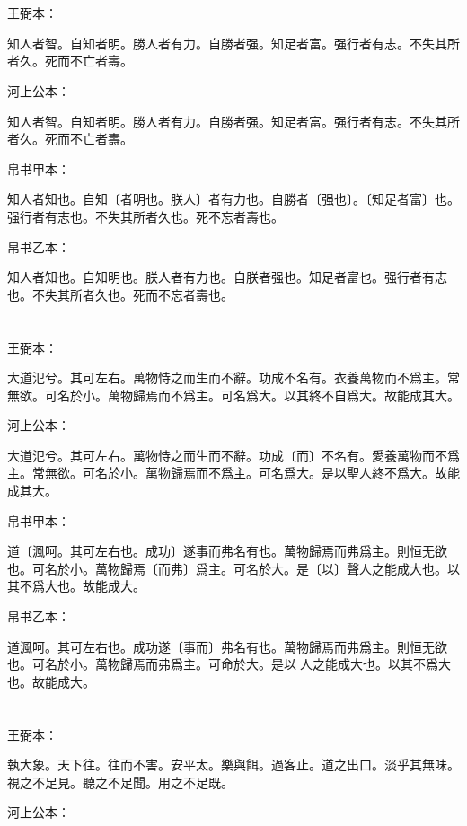 \documentclass[a5paper]{ctexbook}
\begin{document}
    \chapter{}
    王弼本：

    知人者智。自知者明。勝人者有力。自勝者强。知足者富。强行者有志。不失其所者久。死而不亡者壽。

    河上公本：

    知人者智。自知者明。勝人者有力。自勝者强。知足者富。强行者有志。不失其所者久。死而不亡者壽。

    帛书甲本：

    知人者知也。自知〔者明也。朕人〕者有力也。自勝者〔强也〕。〔知足者富〕也。强行者有志也。不失其所者久也。死不忘者壽也。

    帛书乙本：

    知人者知也。自知明也。朕人者有力也。自朕者强也。知足者富也。强行者有志也。不失其所者久也。死而不忘者壽也。

    \chapter{}
    王弼本：

    大道氾兮。其可左右。萬物恃之而生而不辭。功成不名有。衣養萬物而不爲主。常無欲。可名於小。萬物歸焉而不爲主。可名爲大。以其終不自爲大。故能成其大。

    河上公本：

    大道氾兮。其可左右。萬物恃之而生而不辭。功成〔而〕不名有。愛養萬物而不爲主。常無欲。可名於小。萬物歸焉而不爲主。可名爲大。是以聖人終不爲大。故能成其大。

    帛书甲本：

    道〔渢呵。其可左右也。成功〕遂事而弗名有也。萬物歸焉而弗爲主。則恒无欲也。可名於小。萬物歸焉〔而弗〕爲主。可名於大。是〔以〕聲人之能成大也。以其不爲大也。故能成大。

    帛书乙本：

    道渢呵。其可左右也。成功遂〔事而〕弗名有也。萬物歸焉而弗爲主。則恒无欲也。可名於小。萬物歸焉而弗爲主。可命於大。是以𦔻人之能成大也。以其不爲大也。故能成大。

    \chapter{}
    王弼本：

    執大象。天下往。往而不害。安平太。樂與餌。過客止。道之出口。淡乎其無味。視之不足見。聽之不足聞。用之不足既。

    河上公本：
\end{document}
